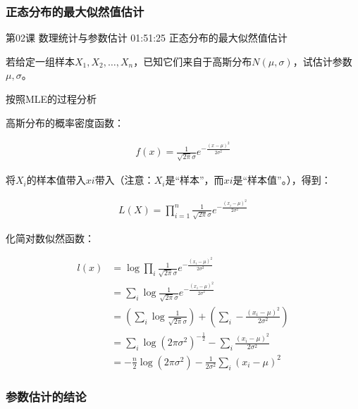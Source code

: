 \documentclass[UTF8]{ctexbook}
\begin{document}
\subsubsection{正态分布的最大似然值估计}

第02课 数理统计与参数估计 01:51:25 正态分布的最大似然值估计

若给定一组样本$X_ {1},X_{2},\dots,X_{n}$，已知它们来自于高斯分布$N(\mu,\sigma)$，试估计参数$\mu,\sigma$。

按照MLE的过程分析

高斯分布的概率密度函数：

\begin{equation}
\begin{aligned}
f(x)=\frac{1}{\sqrt{2\pi}\sigma} e ^{-\frac{(x-\mu)^{2}}{2\sigma^{2}}}
\end{aligned}
\end{equation}

将$X_{i}$的样本值带入$x{i}$带入（注意：$X_{i}$是“样本”，而$x{i}$是“样本值”。），得到：

\begin{equation}
\begin{aligned}
L(X)=\prod_{i=1}^{n} \frac{1}{\sqrt{2\pi}\sigma} e ^{-\frac{(x_{i}-\mu)^{2}}{2\sigma^{2}}}
\end{aligned}
\end{equation}

化简对数似然函数：

\begin{equation}
\begin{aligned}
l(x)&=\log \prod_{i} \frac{1}{\sqrt{2\pi}\sigma} e ^{-\frac{(x_{i}-\mu)^{2}}{2\sigma^{2}}} \\
&=\sum_{i} \log \frac{1}{\sqrt{2\pi}\sigma} e ^{-\frac{(x_{i}-\mu)^{2}}{2\sigma^{2}}} \\
&= \left (  \sum_{i} \log \frac{1}{\sqrt{2\pi}\sigma}  \right ) + \left (  \sum_{i} -\frac{(x_{i}-\mu)^{2}}{2\sigma^{2}}  \right ) \\
&= \sum_{i} \log (2\pi \sigma^{2})^{-\frac{1}{2}} -\sum_{i} \frac{(x_{i}-\mu)^{2}}{2\sigma^{2}} \\
&=-\frac{n}{2} \log (2\pi \sigma^{2}) - \frac{1}{2 \sigma^{2}}\sum_{i}(x_{i}-\mu)^{2}
\end{aligned}
\end{equation}

\subsubsection{参数估计的结论}
\end{document}
